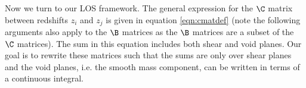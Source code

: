 Now we turn to our LOS framework. The general expression for the $\C$ matrix between redshifts $z_i$ and $z_j$ is given in equation \ref{eqn:cmatdef} (note the following arguments also apply to the $\B$ matrices as the $\B$ matrices are a subset of the $\C$ matrices). The sum in this equation includes both shear and void planes. Our goal is to rewrite these matrices such that the sums are only over shear planes and the void planes, i.e. the smooth mass component, can be written in terms of a continuous integral. 